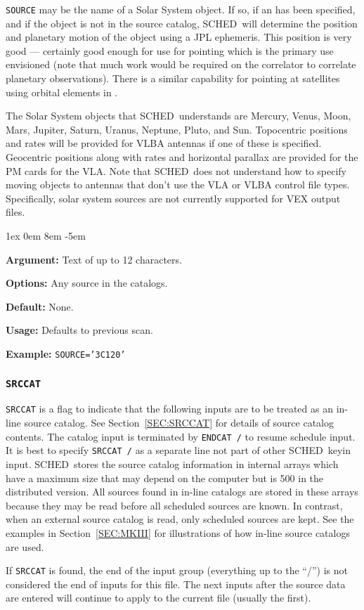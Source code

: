 \documentclass{report}
\newcommand{\schedb}{{\sc SCHED~}}
\newcommand{\rcwbox}[5]{
  \begin{list}{}{\parsep 1ex  \itemsep 0em
                 \leftmargin 8em  \itemindent -5em }
    \item {\bf Argument:} #1
    \item {\bf Options:}  #2
    \item {\bf Default:}  #3
    \item {\bf Usage:}    #4
    \item {\bf Example:}  #5
  \end{list}
}
\begin{document}
{\tt SOURCE} may be the name of a Solar System object.  If so, if
an  has been specified, and if the
object is not in the source catalog, \schedb will determine the position
and planetary motion of the object using a JPL ephemeris.  This position
is very good --- certainly good enough for use for pointing which
is the primary use envisioned (note that much work would be required
on the correlator to correlate planetary observations).  There is
a similar capability for pointing at satellites using orbital
elements in .

The Solar System objects that \schedb understands are Mercury, Venus,
Moon, Mars, Jupiter, Saturn, Uranus, Neptune, Pluto, and Sun.
Topocentric positions and rates will be provided for VLBA antennas if
one of these is specified.  Geocentric positions along with rates and
horizontal parallax are provided for the PM cards for the VLA.  Note
that \schedb does not understand how to specify moving objects to
antennas that don't use the VLA or VLBA control file types.
Specifically, solar system sources are not currently supported
for VEX output files.

\rcwbox
{Text of up to 12 characters.}
{Any source in the catalogs.}
{None.}
{Defaults to previous scan.}
{{\tt SOURCE='3C120'}}


\subsubsection{\label{MP:SRCCAT}{\tt SRCCAT}}

{\tt SRCCAT} is a flag to indicate that the following inputs are
to be treated as an in-line source catalog. See
Section~\ref{SEC:SRCCAT} for details of source catalog contents. The
catalog input is terminated by {\tt ENDCAT /} to resume schedule
input.  It is best to specify {\tt SRCCAT /} as a separate line not
part of other \schedb keyin input. \schedb stores the source
catalog information in internal arrays which have a maximum size that
may depend on the computer but is 500 in the distributed version. All
sources found in in-line catalogs are stored in these arrays because
they may be read before all scheduled sources are known. In contrast,
when an external source catalog is read, only scheduled sources are
kept. See the examples in Section~\ref{SEC:MKIII} for illustrations
of how in-line source catalogs are used.

If {\tt SRCCAT}
is found, the end of the input group (everything up to the ``/'')
is not considered the end of inputs for this file.  The next inputs
after the source data are entered will continue to apply to the current
file (usually the first).
\end{document}
